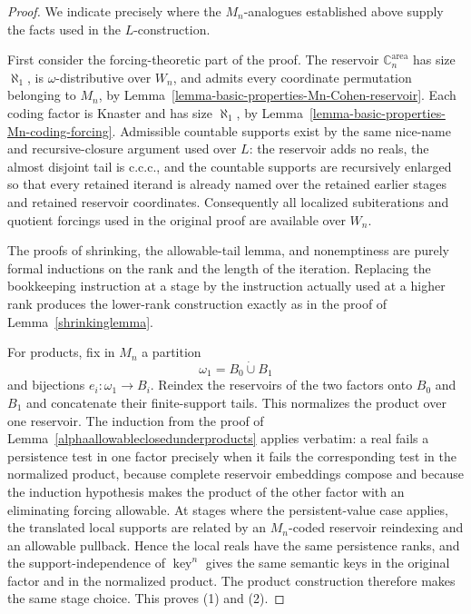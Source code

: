 \documentclass[a4paper,11pt]{article}
\newcommand{\forceC}{\mathbb{C}}
\newcommand{\key}{\operatorname{key}}
\begin{document}
\begin{proof}
We indicate precisely where the $M_n$-analogues established above supply the
facts used in the $L$-construction.

First consider the forcing-theoretic part of the proof.  The reservoir
$\forceC^{\mathrm{area}}_n$ has size $\aleph_1$, is
$\omega$-distributive over $W_n$, and admits every coordinate permutation
belonging to $M_n$, by
Lemma~\ref{lemma-basic-properties-Mn-Cohen-reservoir}.  Each coding factor is
Knaster and has size $\aleph_1$, by
Lemma~\ref{lemma-basic-properties-Mn-coding-forcing}.  Admissible countable
supports exist by the same nice-name and recursive-closure argument used over
$L$: the reservoir adds no reals, the almost disjoint tail is c.c.c., and the
countable supports are recursively enlarged so that every retained iterand is
already named over the retained earlier stages and retained reservoir
coordinates.  Consequently all localized subiterations and quotient forcings
used in the original proof are available over $W_n$.

The proofs of shrinking, the allowable-tail lemma, and nonemptiness are purely
formal inductions on the rank and the length of the iteration.  Replacing the
bookkeeping instruction at a stage by the instruction actually used at a
higher rank produces the lower-rank construction exactly as in the proof of
Lemma~\ref{shrinkinglemma}.

For products, fix in $M_n$ a partition
\[
   \omega_1=B_0\mathbin{\dot\cup}B_1
\]
and bijections $e_i:\omega_1\to B_i$.  Reindex the reservoirs of the two
factors onto $B_0$ and $B_1$ and concatenate their finite-support tails.  This
normalizes the product over one reservoir.  The induction from the proof of
Lemma~\ref{alphaallowableclosedunderproducts} applies verbatim: a real
fails a persistence test in one factor precisely when it fails the
corresponding test in the normalized product, because complete reservoir
embeddings compose and because the induction hypothesis makes the product of
the other factor with an eliminating forcing allowable.  At stages where the
persistent-value case applies, the translated local supports are related by
an $M_n$-coded reservoir reindexing and an allowable pullback.  Hence the
local reals have the same persistence ranks, and the support-independence of
$\key^n$ gives the same semantic keys in the original factor and in the
normalized product.  The product construction therefore makes the same
stage choice.  This proves (1) and (2).


\end{proof}
\end{document}
